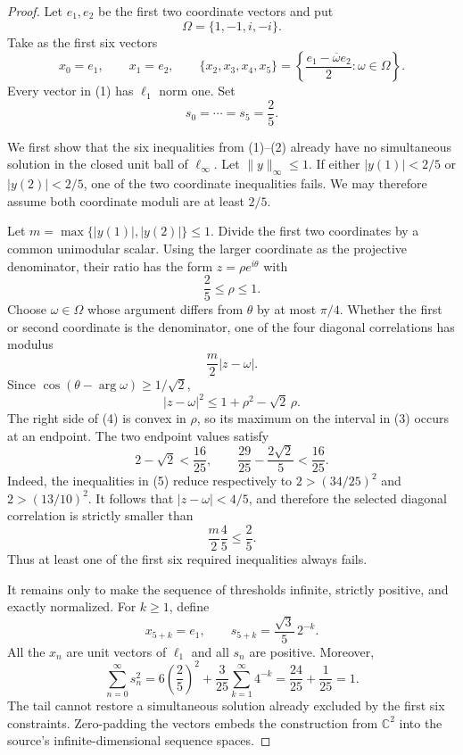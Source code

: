 \documentclass[11pt]{article}
\newcommand{\C}{\mathbb C}
\begin{document}
\begin{proof}
Let $e_1,e_2$ be the first two coordinate vectors and put
\[
 \Omega=\{1,-1,i,-i\}.
\]
Take as the first six vectors
\[
 x_0=e_1,\qquad x_1=e_2,\qquad
 \{x_2,x_3,x_4,x_5\}
 =\left\{\frac{e_1-\overline\omega e_2}{2}:\omega\in\Omega\right\}.
 \tag{1}
\]
Every vector in (1) has $\ell_1$ norm one.  Set
\[
 s_0=\cdots=s_5=\frac25.                                      \tag{2}
\]

We first show that the six inequalities from (1)--(2) already have no
simultaneous solution in the closed unit ball of $\ell_\infty$.  Let
$\|y\|_\infty\le1$.  If either $|y(1)|<2/5$ or $|y(2)|<2/5$, one of the two
coordinate inequalities fails.  We may therefore assume both coordinate
moduli are at least $2/5$.

Let $m=\max\{|y(1)|,|y(2)|\}\le1$.  Divide the first two coordinates by a
common unimodular scalar.  Using the larger coordinate as the projective
denominator, their ratio has the form $z=\rho e^{i\theta}$ with
\[
 \frac25\le\rho\le1.                                         \tag{3}
\]
Choose $\omega\in\Omega$ whose argument differs from $\theta$ by at most
$\pi/4$.  Whether the first or second coordinate is the denominator, one of
the four diagonal correlations has modulus
\[
 \frac m2|z-\omega|.
\]
Since $\cos(\theta-\arg\omega)\ge1/\sqrt2$,
\[
 |z-\omega|^2
 \le 1+\rho^2-\sqrt2\,\rho.                                 \tag{4}
\]
The right side of (4) is convex in $\rho$, so its maximum on the interval
in (3) occurs at an endpoint.  The two endpoint values satisfy
\[
 2-\sqrt2<\frac{16}{25},
 \qquad
 \frac{29}{25}-\frac{2\sqrt2}{5}<\frac{16}{25}.              \tag{5}
\]
Indeed, the inequalities in (5) reduce respectively to
$2>(34/25)^2$ and $2>(13/10)^2$.  It follows that
$|z-\omega|<4/5$, and therefore the selected diagonal correlation is
strictly smaller than
\[
 \frac m2\frac45\le\frac25.
\]
Thus at least one of the first six required inequalities always fails.

It remains only to make the sequence of thresholds infinite, strictly
positive, and exactly normalized.  For $k\ge1$, define
\[
 x_{5+k}=e_1,
 \qquad
 s_{5+k}=\frac{\sqrt3}{5}\,2^{-k}.                           \tag{6}
\]
All the $x_n$ are unit vectors of $\ell_1$ and all $s_n$ are positive.
Moreover,
\[
 \sum_{n=0}^{\infty}s_n^2
 =6\left(\frac25\right)^2
   +\frac3{25}\sum_{k=1}^{\infty}4^{-k}
 =\frac{24}{25}+\frac1{25}=1.
\]
The tail cannot restore a simultaneous solution already excluded by the
first six constraints.  Zero-padding the vectors embeds the construction
from $\C^2$ into the source's infinite-dimensional sequence spaces.
\end{proof}
\end{document}
